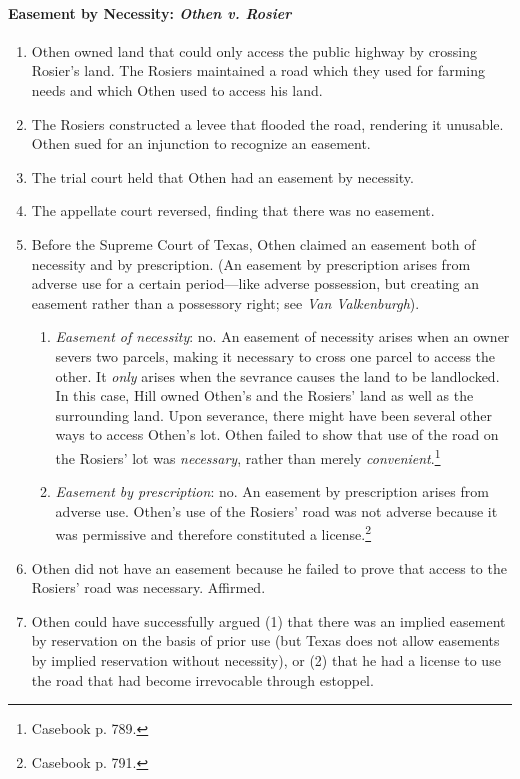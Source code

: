 \paragraph{Easement by Necessity: \emph{Othen v. Rosier}}

\begin{enumerate}
    \item Othen owned land that could only access the public highway by 
    crossing Rosier's land. The Rosiers maintained a road which they used for 
    farming needs and which Othen used to access his land.
    \item The Rosiers constructed a levee that flooded the road, rendering it 
    unusable. Othen sued for an injunction to recognize an easement.
    \item The trial court held that Othen had an easement by necessity.
    \item The appellate court reversed, finding that there was no easement.
    \item Before the Supreme Court of Texas, Othen claimed an easement both of 
    necessity and by prescription. (An easement by prescription arises from 
    adverse use for a certain period---like adverse possession, but creating 
    an easement rather than a possessory right; see \emph{Van Valkenburgh}).
    \begin{enumerate}
        \item \emph{Easement of necessity}: no. An easement of necessity 
        arises when an owner severs two parcels, making it necessary to cross 
        one parcel to access the other. It \emph{only} arises when the 
        sevrance causes the land to be landlocked. In this case, Hill owned 
        Othen's and the Rosiers' land as well as the surrounding land. Upon 
        severance, there might have been several other ways to access Othen's 
        lot. Othen failed to show that use of the road on the Rosiers' lot was 
        \emph{necessary}, rather than merely 
        \emph{convenient}.\footnote{Casebook p. 789.}
        \item \emph{Easement by prescription}: no. An easement by prescription 
        arises from adverse use. Othen's use of the Rosiers' road was not 
        adverse because it was permissive and therefore constituted a 
        license.\footnote{Casebook p. 791.}
    \end{enumerate}
    \item Othen did not have an easement because he failed to prove that 
    access to the Rosiers' road was necessary. Affirmed.
    \item Othen could have successfully argued (1) that there was an implied 
    easement by reservation on the basis of prior use (but Texas does not 
    allow easements by implied reservation without necessity), or (2) that he 
    had a license to use the road that had become irrevocable through 
    estoppel.
\end{enumerate}

